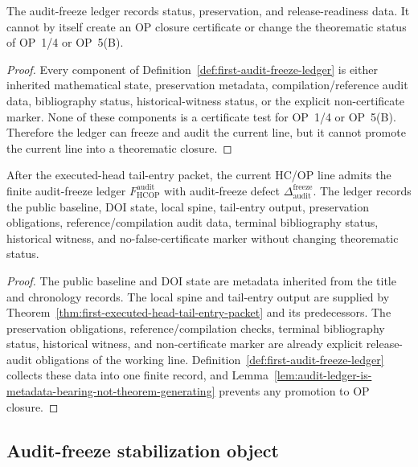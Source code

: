 \begin{lemma}
\label{lem:audit-ledger-is-metadata-bearing-not-theorem-generating}
The audit-freeze ledger records status, preservation, and release-readiness data. It cannot by itself create an OP closure certificate or change the theorematic status of OP~1/4 or OP~5(B).
\end{lemma}

\begin{proof}
Every component of Definition~\ref{def:first-audit-freeze-ledger} is either inherited mathematical state, preservation metadata, compilation/reference audit data, bibliography status, historical-witness status, or the explicit non-certificate marker. None of these components is a certificate test for OP~1/4 or OP~5(B). Therefore the ledger can freeze and audit the current line, but it cannot promote the current line into a theorematic closure.
\end{proof}

\begin{theorem}
\label{thm:first-audit-freeze-ledger}
After the executed-head tail-entry packet, the current HC/OP line admits the finite audit-freeze ledger \(F_{\mathrm{HCOP}}^{\mathrm{audit}}\) with audit-freeze defect \(\Delta_{\mathrm{audit}}^{\mathrm{freeze}}\). The ledger records the public baseline, DOI state, local spine, tail-entry output, preservation obligations, reference/compilation audit data, terminal bibliography status, historical witness, and no-false-certificate marker without changing theorematic status.
\end{theorem}

\begin{proof}
The public baseline and DOI state are metadata inherited from the title and chronology records. The local spine and tail-entry output are supplied by Theorem~\ref{thm:first-executed-head-tail-entry-packet} and its predecessors. The preservation obligations, reference/compilation checks, terminal bibliography status, historical witness, and non-certificate marker are already explicit release-audit obligations of the working line. Definition~\ref{def:first-audit-freeze-ledger} collects these data into one finite record, and Lemma~\ref{lem:audit-ledger-is-metadata-bearing-not-theorem-generating} prevents any promotion to OP closure.
\end{proof}

\subsection{Audit-freeze stabilization object}
\label{subsec:audit-freeze-stabilization-object}


